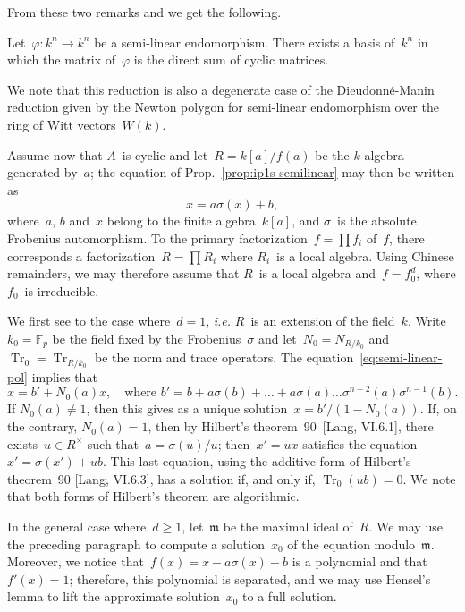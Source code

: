 \documentclass{lms}
\let\fr\mathfrak
\DeclareMathOperator\Tr{Tr}
\def\F{\mathbb{F}}
\begin{document}
From these two remarks and \cite[Ch.~3, Th.~19]{jacobson1943rings} we get
the following.
\begin{thm}
Let~$φ: k^n → k^n$ be a semi-linear endomorphism. There exists a basis
of~$k^n$ in which the matrix of~$φ$ is the direct sum of cyclic matrices.
\end{thm}
We note that this reduction is also a degenerate case of
the Dieudonné-Manin reduction given by the Newton polygon
for semi-linear endomorphism over the ring of Witt vectors~$W(k)$.


Assume now that $A$~is cyclic and let~$R = k[a]/f(a)$ be the $k$-algebra
generated by~$a$; the equation of Prop.~\eqref{prop:ip1s-semilinear} may
then be written as
\begin{equation}\label{eq:semi-linear-pol}
x = a σ(x) + b,
\end{equation}
where~$a$, $b$ and~$x$ belong to the finite algebra~$k[a]$, and $σ$~is
the absolute Frobenius automorphism. To the primary factorization~$f = ∏
f_i$ of~$f$, there corresponds a factorization~$R = ∏ R_i$ where $R_i$~is
a local algebra. Using Chinese remainders, we may therefore assume that
$R$~is a local algebra and~$f = f_0^d$, where $f_0$~is irreducible.

We first see to the case where~$d = 1$, \emph{i.e.} $R$~is an extension
of the field~$k$. Write~$k_0 = \F_p$ be the field fixed by the
Frobenius~$σ$ and let~$N_0 = N_{R/k_0}$ and~$\Tr_0 = \Tr_{R/k_0}$ be the
norm and trace operators. The equation~\eqref{eq:semi-linear-pol} implies
that
\begin{equation}
x = b' + N_0(a) x, \quad\text{where $b' = b + a σ(b) + … + a σ(a) …
σ^{n-2}(a) σ^{n-1}(b)$.}
\end{equation}
If $N_0(a) ≠ 1$, then this gives as a unique solution~$x =
b'/(1-N_0(a))$. If, on the contrary, $N_0(a) = 1$, then by
Hilbert's theorem~90~[Lang, VI.6.1], there exists~$u ∈ R^{×}$ such
that~$a = σ(u)/u$; then~$x' = ux$ satisfies the equation~$x' = σ(x') +
ub$. This last equation, using the additive form of Hilbert's theorem~90
[Lang, VI.6.3], has a solution if, and only if, $\Tr_0 (ub) = 0$. We
note that both forms of Hilbert's theorem are algorithmic.

In the general case where~$d ≥ 1$, let~$\fr m$ be the maximal ideal
of~$R$. We may use the preceding paragraph to compute a solution~$x_0$ of
the equation modulo~$\fr m$. Moreover, we notice that~$f(x) = x -  a σ(x)
- b$ is a polynomial and that~$f'(x) = 1$; therefore, this polynomial is
separated, and we may use Hensel's lemma to lift the approximate
solution~$x_0$ to a full solution.
\end{document}
